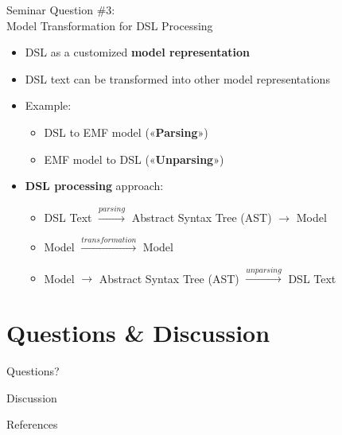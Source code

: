 \documentclass[10pt]{beamer}
\begin{document}
\begin{frame}{Seminar Question \#3: \\Model Transformation for DSL Processing}

	\begin{itemize}
		\item DSL as a customized \textbf{model representation}
		\item DSL text can be transformed into other model representations
		\item Example:
		\begin{itemize}
			\item DSL to EMF model («\textbf{Parsing}»)
			\item EMF model to DSL («\textbf{Unparsing}»)
		\end{itemize}
	\end{itemize}
	\bigskip
	\begin{itemize}
		\item \textbf{DSL processing} approach:
		\begin{itemize}
			\item DSL Text $\xrightarrow{parsing}$ Abstract Syntax Tree (AST) $\xrightarrow{}$ Model
			\item Model $\xrightarrow{transformation}$ Model
			\item Model $\xrightarrow{}$ Abstract Syntax Tree (AST) $\xrightarrow{unparsing}$ DSL Text
		\end{itemize}
	\end{itemize}

\end{frame}

\section{Questions \& Discussion}

\begin{frame}[standout]
  Questions?
\end{frame}

\begin{frame}[standout]
  Discussion
\end{frame}

\appendix

\begin{frame}[allowframebreaks]{References}

  
  

\end{frame}
\end{document}
